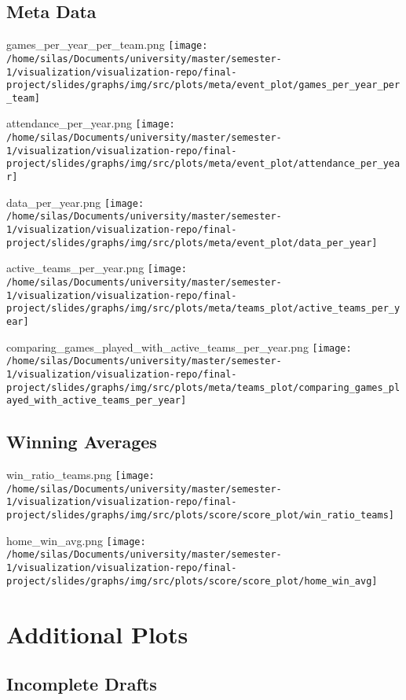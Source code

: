 \documentclass[pdf]{beamer}
\begin{document}
\subsection{Meta Data}
\begin{frame}{games\_per\_year\_per\_team.png}
	\centering
	\texttt{[image: /home/silas/Documents/university/master/semester-1/visualization/visualization-repo/final-project/slides/graphs/img/src/plots/meta/event\_plot/games\_per\_year\_per\_team]}
\end{frame}
\begin{frame}{attendance\_per\_year.png}
	\centering
	\texttt{[image: /home/silas/Documents/university/master/semester-1/visualization/visualization-repo/final-project/slides/graphs/img/src/plots/meta/event\_plot/attendance\_per\_year]}
\end{frame}
\begin{frame}{data\_per\_year.png}
	\centering
	\texttt{[image: /home/silas/Documents/university/master/semester-1/visualization/visualization-repo/final-project/slides/graphs/img/src/plots/meta/event\_plot/data\_per\_year]}
\end{frame}
\begin{frame}{active\_teams\_per\_year.png}
	\centering
	\texttt{[image: /home/silas/Documents/university/master/semester-1/visualization/visualization-repo/final-project/slides/graphs/img/src/plots/meta/teams\_plot/active\_teams\_per\_year]}
\end{frame}
\begin{frame}{comparing\_games\_played\_with\_active\_teams\_per\_year.png}
	\centering
	\texttt{[image: /home/silas/Documents/university/master/semester-1/visualization/visualization-repo/final-project/slides/graphs/img/src/plots/meta/teams\_plot/comparing\_games\_played\_with\_active\_teams\_per\_year]}
\end{frame}
\subsection{Winning Averages}
\begin{frame}{win\_ratio\_teams.png}
	\centering
	\texttt{[image: /home/silas/Documents/university/master/semester-1/visualization/visualization-repo/final-project/slides/graphs/img/src/plots/score/score\_plot/win\_ratio\_teams]}
\end{frame}
\begin{frame}{home\_win\_avg.png}
	\centering
	\texttt{[image: /home/silas/Documents/university/master/semester-1/visualization/visualization-repo/final-project/slides/graphs/img/src/plots/score/score\_plot/home\_win\_avg]}
\end{frame}
\section{Additional Plots}
\subsection{Incomplete Drafts}
\end{document}
